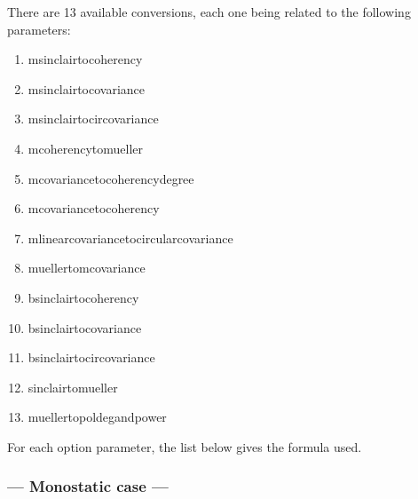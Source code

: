 There are 13 available conversions, each one being related to the following  parameters:
\begin{enumerate}
\item msinclairtocoherency
\item msinclairtocovariance
\item msinclairtocircovariance
\item mcoherencytomueller
\item mcovariancetocoherencydegree
\item mcovariancetocoherency
\item mlinearcovariancetocircularcovariance
\item muellertomcovariance
\item bsinclairtocoherency
\item bsinclairtocovariance
\item bsinclairtocircovariance
\item sinclairtomueller
\item muellertopoldegandpower
\end{enumerate}

For each option parameter, the list below gives the formula used.

\subsubsection{--- Monostatic case ---}

